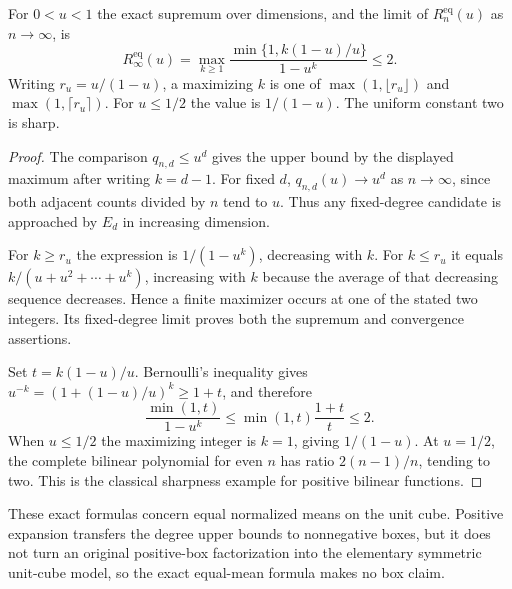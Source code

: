 \begin{corollary}\label{cor:equal-infinite}
For $0<u<1$ the exact supremum over dimensions, and the limit of
$R_n^{\mathrm{eq}}(u)$ as $n\to\infty$, is
\begin{equation}\label{eq:equal-infinite}
 R_\infty^{\mathrm{eq}}(u)
 =\max_{k\ge1}\frac{\min\{1,k(1-u)/u\}}{1-u^k}\le2.
\end{equation}
Writing $r_u=u/(1-u)$, a maximizing $k$ is one of
$\max(1,\lfloor r_u\rfloor)$ and $\max(1,\lceil r_u\rceil)$.
For $u\le1/2$ the value is $1/(1-u)$. The uniform constant two is sharp.
\end{corollary}
\begin{proof}
The comparison $q_{n,d}\le u^d$ gives the upper bound by the displayed
maximum after writing $k=d-1$. For fixed $d$,
$q_{n,d}(u)\to u^d$ as $n\to\infty$, since both adjacent counts divided
by $n$ tend to $u$. Thus any fixed-degree candidate is approached by
$E_d$ in increasing dimension.

For $k\ge r_u$ the expression is $1/(1-u^k)$, decreasing with $k$.
For $k\le r_u$ it equals $k/(u+u^2+\cdots+u^k)$, increasing with $k$
because the average of that decreasing sequence decreases. Hence a finite
maximizer occurs at one of the stated two integers. Its fixed-degree
limit proves both the supremum and convergence assertions.

Set $t=k(1-u)/u$. Bernoulli's inequality gives
$u^{-k}=(1+(1-u)/u)^k\ge1+t$, and therefore
\[
 \frac{\min(1,t)}{1-u^k}\le\min(1,t)\frac{1+t}{t}\le2.
\]
When $u\le1/2$ the maximizing integer is $k=1$, giving $1/(1-u)$.
At $u=1/2$, the complete bilinear polynomial for even $n$ has ratio
$2(n-1)/n$, tending to two. This is the classical sharpness example for
positive bilinear functions.
\end{proof}

These exact formulas concern equal normalized means on the unit cube.
Positive expansion transfers the degree upper bounds to nonnegative boxes,
but it does not turn an original positive-box factorization into the
elementary symmetric unit-cube model, so the exact equal-mean formula makes
no box claim.
